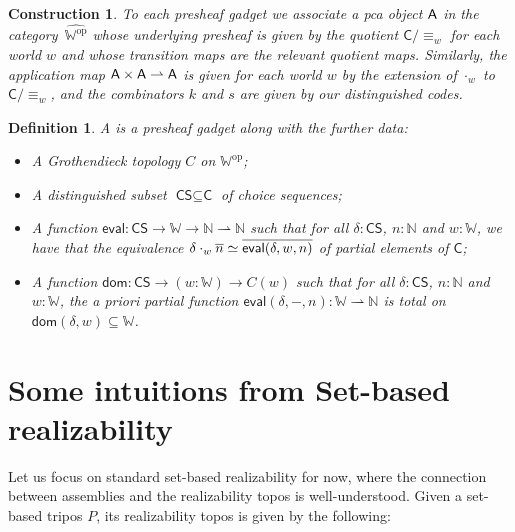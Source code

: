 \documentclass[11pt]{article}
\newtheorem{defn}[thrm]{Definition}
\newtheorem{cons}[thrm]{Construction}
\begin{document}
\begin{cons}
  To each presheaf gadget we associate a pca object \(\mathsf{A}\) in the
  category~\(\widehat{\mathbb{W}^{\text{op}}}\) whose underlying presheaf
  is given by the quotient \({\mathsf{C}}/{\equiv_{w}}\) for each world \(w\)
  and whose transition maps are the relevant quotient maps.
  Similarly, the application map \(\mathsf{A} \times \mathsf{A} \rightharpoonup \mathsf{A}\) is given
  for each world \(w\) by the extension of \(\cdot_{w}\) to
  \({\mathsf{C}}/{\equiv_{w}}\), and the combinators \(k\) and \(s\) are given
  by our distinguished codes.
\end{cons}

\begin{defn}
  A  is a
  presheaf gadget along with the further data:
  \begin{itemize}
    \item A Grothendieck topology \(C\) on \(\mathbb{W}^{\text{op}}\);
    \item A distinguished subset \(\textsf{CS} \subseteq \textsf{C}\) of choice
      sequences;
    \item A function
      \(\textsf{eval} : \textsf{CS} \to \mathbb{W} \to \mathbb{N} \rightharpoonup \mathbb{N}\)
      such that for all \(\delta : \textsf{CS}\), \(n : \mathbb{N}\) and
      \(w : \mathbb{W}\), we have that the equivalence
      \({\delta \cdot_{w} \overline{n}}\simeq{\overline{\textsf{eval}(\delta,w,n)}}\)
      of partial elements of \(\textsf{C}\);
    \item A function
      \(\textsf{dom} : \textsf{CS} \to (w : \mathbb{W}) \to C(w)\) such that for
      all \(\delta : \textsf{CS}\), \(n : \mathbb{N}\) and \(w : \mathbb{W}\),
      the a priori partial function
      \(\textsf{eval}(\delta,-,n) : \mathbb{W} \rightharpoonup \mathbb{N}\) is
      total on \(\textsf{dom}(\delta,w)\subseteq \mathbb{W}\).
  \end{itemize}
\end{defn}

\newpage
\appendix

\section{Some intuitions from Set-based realizability}

Let us focus on standard set-based realizability for now, where the connection
between assemblies and the realizability topos is well-understood.
%
Given a set-based tripos \(P\), its realizability topos is given by the
following:
\end{document}

